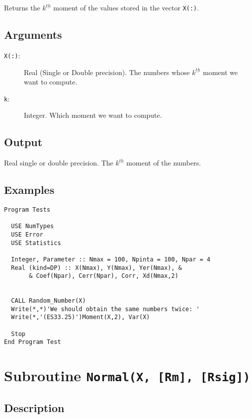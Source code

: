 Returns the $k^{\underline{th}}$ moment of the values stored in the
vector \texttt{X(:)}.

\subsection{Arguments}

\begin{description}
\item[\texttt{X(:)}:] Real (Single or Double precision). The numbers
  whose $k^{\underline{th}}$ moment we want to compute.
\item[\texttt{k}:] Integer. Which moment we want to compute.
\end{description}

\subsection{Output}

Real single or double precision. The $k^{\underline{th}}$ moment of
the numbers.

\subsection{Examples}

\begin{lstlisting}[emph=Moment,
                   emphstyle=\color{blue},
                   frame=trBL,
                   caption=Computing the k$^{\text{\underline{th}}}$
                   moment of a data set.,
                   label=moment]
Program Tests

  USE NumTypes
  USE Error
  USE Statistics

  Integer, Parameter :: Nmax = 100, Npinta = 100, Npar = 4
  Real (kind=DP) :: X(Nmax), Y(Nmax), Yer(Nmax), &
       & Coef(Npar), Cerr(Npar), Corr, Xd(Nmax,2)


  CALL Random_Number(X)
  Write(*,*)'We should obtain the same numbers twice: '
  Write(*,'(ES33.25)')Moment(X,2), Var(X)

  Stop
End Program Test
\end{lstlisting}

\section{Subroutine \texttt{Normal(X, [Rm], [Rsig])}}

\subsection{Description}

